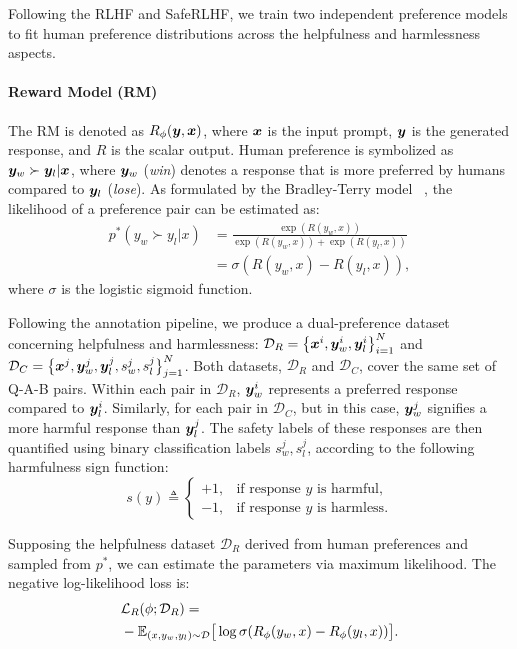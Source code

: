 \documentclass[11pt]{article}
\theoremstyle{plain}
\theoremstyle{definition}
\theoremstyle{remark}
\begin{document}
Following the RLHF and SafeRLHF, we train two independent preference models to fit human preference distributions across the helpfulness and harmlessness aspects. 
\paragraph{Reward Model (RM)}
The RM is denoted as $R_{\phi}({\bm{y}}, {\bm{x}})$, where ${\bm{x}}$ is the input prompt, ${\bm{y}}$ is the generated response, and $R$ is the scalar output. 
Human preference is symbolized as ${\bm{y}}_{w} \succ {\bm{y}}_{l} | {\bm{x}}$, where ${\bm{y}}_{w}$ (\textit{win}) denotes a response that is more preferred by humans compared to ${\bm{y}}_{l}$ (\textit{lose}).
As formulated by the Bradley-Terry model ~\citep{bradley1952rank}, the likelihood of a preference pair can be estimated as:
\begin{align}
 p^*(y_w \succ y_l | x) & = \frac{\exp(R(y_w,x))}{\exp(R(y_w,x))+\exp(R(y_l,x))} \nonumber \\
& = \sigma ( R(y_w,x) - R(y_l,x)),
\end{align}
where $\sigma$ is the logistic sigmoid function.

Following the annotation pipeline, we produce a dual-preference dataset concerning helpfulness and harmlessness: $\mathcal D_R=\big\{{\bm{x}}^i, {\bm{y}}^i_w, {\bm{y}}^i_l\big\}_{i=1}^N$ and $\mathcal D_C=\big\{{\bm{x}}^j, {\bm{y}}^j_w, {\bm{y}}^j_l, s^j_w, s^j_l\big\}_{j=1}^N$.
Both datasets, $\mathcal D_R$ and $\mathcal D_C$, cover the same set of Q-A-B pairs. 
Within each pair in $\mathcal D_R$, ${\bm{y}}^i_w$ represents a preferred response compared to ${\bm{y}}^i_l$. 
Similarly, for each pair in $\mathcal D_C$, but in this case, ${\bm{y}}^j_w$ signifies a more harmful response than ${\bm{y}}^j_l$.
The safety labels of these responses are then quantified using binary classification labels $s^j_w, s^j_l$, according to the following harmfulness sign function:
\begin{equation}
s (y) \triangleq \begin{cases}
+1, & \text{if response $y$ is harmful},\\
-1, & \text{if response $y$ is harmless}.
\end{cases}
\end{equation}


Supposing the helpfulness dataset $\mathcal{D}_R$ derived from human preferences and sampled from $p^*$, we can estimate the parameters via maximum likelihood. The negative log-likelihood loss is:
\begin{align*}
&\mathcal{L}_R (\phi; \mathcal{D}_R) =   \\
&-\mathbb{E}_{{(x,y_w,y_l)\sim \mathcal{D}}} \big[\log \sigma (R_{\phi} (y_w,x) - R_{\phi} (y_l,x))\big].
\end{align*}
\end{document}
